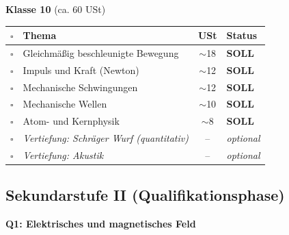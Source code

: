 \documentclass[11pt,a4paper]{article}
\newcommand{\checkbox}{$\square$}
\begin{document}
\begin{center}
\textbf{Klasse 10} (ca. 60 USt)
\end{center}

\begin{tabularx}{\textwidth}{c|l|c|X}
\rowcolor{lightblue}
\checkbox & \textbf{Thema} & \textbf{USt} & \textbf{Status} \\
\hline
\checkbox & Gleichmäßig beschleunigte Bewegung & $\sim$18 & \textbf{SOLL} \\
\rowcolor{lightgray}
\checkbox & Impuls und Kraft (Newton) & $\sim$12 & \textbf{SOLL} \\
\checkbox & Mechanische Schwingungen & $\sim$12 & \textbf{SOLL} \\
\rowcolor{lightgray}
\checkbox & Mechanische Wellen & $\sim$10 & \textbf{SOLL} \\
\checkbox & Atom- und Kernphysik & $\sim$8 & \textbf{SOLL} \\
\rowcolor{lightgray}
\checkbox & \textit{Vertiefung: Schräger Wurf (quantitativ)} & -- & \textit{optional} \\
\checkbox & \textit{Vertiefung: Akustik} & -- & \textit{optional} \\
\hline
\end{tabularx}

\subsection{Sekundarstufe II (Qualifikationsphase)}

\begin{center}
\textbf{Q1: Elektrisches und magnetisches Feld}
\end{center}
\end{document}

